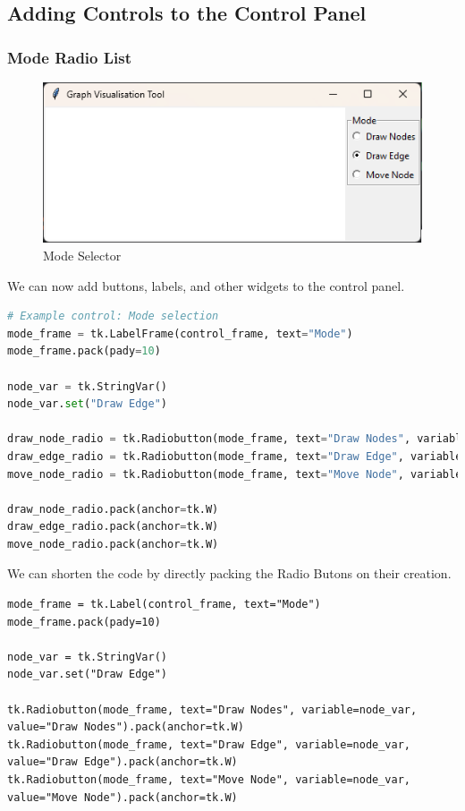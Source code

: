 \documentclass{article}
\begin{document}
\subsection{Adding Controls to the Control Panel}
\subsubsection{Mode Radio List}
\begin{figure}[h]
    \centering
    \includegraphics[width=0.5\linewidth]{images/mode_selector.png}
    \caption{Mode Selector}
    \label{fig:mode_selector}
\end{figure}
We can now add buttons, labels, and other widgets to the control panel.

\begin{lstlisting}[language=Python]
# Example control: Mode selection
mode_frame = tk.LabelFrame(control_frame, text="Mode")
mode_frame.pack(pady=10)

node_var = tk.StringVar()
node_var.set("Draw Edge")

draw_node_radio = tk.Radiobutton(mode_frame, text="Draw Nodes", variable=node_var, value="Draw Nodes")
draw_edge_radio = tk.Radiobutton(mode_frame, text="Draw Edge", variable=node_var, value="Draw Edge")
move_node_radio = tk.Radiobutton(mode_frame, text="Move Node", variable=node_var, value="Move Node")

draw_node_radio.pack(anchor=tk.W)
draw_edge_radio.pack(anchor=tk.W)
move_node_radio.pack(anchor=tk.W)
\end{lstlisting}

We can shorten the code by directly packing the Radio Butons on their creation.

\begin{lstlisting}
mode_frame = tk.Label(control_frame, text="Mode")
mode_frame.pack(pady=10)

node_var = tk.StringVar()
node_var.set("Draw Edge")

tk.Radiobutton(mode_frame, text="Draw Nodes", variable=node_var, value="Draw Nodes").pack(anchor=tk.W)
tk.Radiobutton(mode_frame, text="Draw Edge", variable=node_var, value="Draw Edge").pack(anchor=tk.W)
tk.Radiobutton(mode_frame, text="Move Node", variable=node_var, value="Move Node").pack(anchor=tk.W)
\end{lstlisting}
\end{document}
